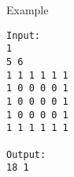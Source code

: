 Example
\begin{verbatim}
Input:
1
5 6
1 1 1 1 1 1
1 0 0 0 0 1
1 0 0 0 0 1
1 0 0 0 0 1
1 1 1 1 1 1

Output:
18 1
\end{verbatim}
